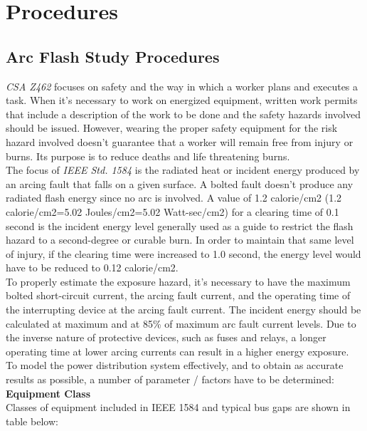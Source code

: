 \section{Procedures}
\label{af:p}

\subsection{Arc Flash Study Procedures}
\label{af:p:afsp}

\emph{CSA Z462} focuses on safety and the way in which a worker plans and executes a task. When it's necessary to work on energized equipment, written work permits that include a description of the work to be done and the safety hazards involved should be issued. However, wearing the proper safety equipment for the risk hazard involved doesn't guarantee that a worker will remain free from injury or burns. Its purpose is to reduce deaths and life threatening burns.\\

The focus of \emph{IEEE Std. 1584} is the radiated heat or incident energy produced by an arcing fault that falls on a given surface. A bolted fault doesn't produce any radiated flash energy since no arc is involved. A value of 1.2 calorie/cm2 (1.2 calorie/cm2=5.02 Joules/cm2=5.02 Watt-sec/cm2) for a clearing time of 0.1 second is the incident energy level generally used as a guide to restrict the flash hazard to a second-degree or curable burn. In order to maintain that same level of injury, if the clearing time were increased to 1.0 second, the energy level would have to be reduced to 0.12 calorie/cm2.\\

To properly estimate the exposure hazard, it's necessary to have the maximum bolted short-circuit current, the arcing fault current, and the operating time of the interrupting device at the arcing fault current. The incident energy should be calculated at maximum and at 85\% of maximum arc fault current levels. Due to the inverse nature of protective devices, such as fuses and relays, a longer operating time at lower arcing currents can result in a higher energy exposure.\\

To model the power distribution system effectively, and to obtain as accurate results as possible, a number of parameter / factors have to be determined:\\ 

\noindent\textbf{Equipment Class } \\
\noindent Classes of equipment included in IEEE 1584 and typical bus gaps are shown in table below: 

